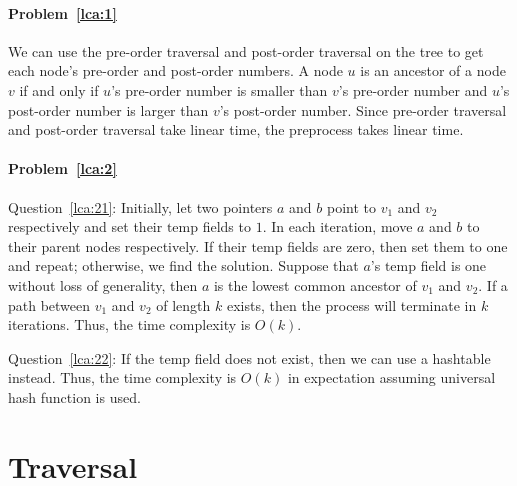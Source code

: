 \begin{Answer}
\paragraph{Problem~\ref{lca:1}}
We can use the pre-order traversal and post-order traversal on the tree to get each node's pre-order and post-order numbers. A node $u$ is an ancestor of a node $v$ if and only if $u$'s pre-order number is smaller than $v$'s pre-order number and $u$'s post-order number is larger than $v$'s post-order number. Since pre-order traversal and post-order traversal take linear time, the preprocess takes linear time.

\paragraph{Problem~\ref{lca:2}}
Question~\ref{lca:21}: Initially, let two pointers $a$ and $b$ point to $v_1$ and $v_2$ respectively and set their $\text{temp}$ fields to $1$. In each iteration, move $a$ and $b$ to their parent nodes respectively. If their $\text{temp}$ fields are zero, then set them to one and repeat; otherwise, we find the solution. Suppose that $a$'s $\text{temp}$ field is one without loss of generality, then $a$ is the lowest common ancestor of $v_1$ and $v_2$. If a path between $v_1$ and $v_2$ of length $k$ exists, then the process will terminate in $k$ iterations. Thus, the time complexity is $O(k)$.

Question~\ref{lca:22}: If the $\text{temp}$ field does not exist, then we can use a hashtable instead. Thus, the time complexity is $O(k)$ in expectation assuming universal hash function is used.
\end{Answer}

\section{Traversal}
